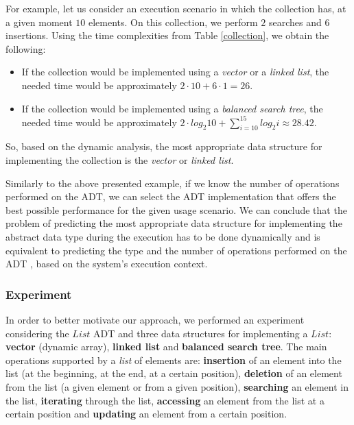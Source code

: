 For example, let us consider an execution scenario in which the collection has, at a given moment $10$ elements. On this collection, we perform $2$ searches and $6$ insertions. Using the time complexities from Table \ref{collection}, we obtain the following:

\begin{itemize}

\item If the collection would be implemented using a \emph{vector} or a \emph{linked list}, the needed time would be approximately $2 \cdot 10 + 6 \cdot 1=26$. 

\item If the collection would be implemented using a \emph{balanced search tree}, the needed time would be approximately $ 2 \cdot log_2{10} + \sum \limits_{i=10}^{15}{log_{2}i} \approx 28.42 $. 

\end{itemize}   
    
So, based on the dynamic analysis, the most appropriate data structure for implementing the collection is the \emph{vector} or \emph{linked list}. 

Similarly to the above presented example, if we know the number of operations performed on the ADT, we can select the ADT implementation that offers the best possible performance for the given usage scenario. We can conclude that the problem of predicting the most appropriate data structure for implementing the abstract data type during the execution has to be done dynamically and is equivalent to predicting the type and the number of operations performed on the ADT , based on the system's execution context.  

\subsubsection{Experiment}\label{exper}

In order to better motivate our approach, we performed an experiment considering the $List$ ADT and three data structures for implementing a $List$: \textbf{vector} (dynamic array), \textbf{linked list} and \textbf{balanced search tree}. The main operations supported by a \emph{list} of elements are: \textbf{insertion} of an element into the list (at the beginning, at the end, at a certain position), \textbf{deletion} of an element from the list (a given element or from a given position), \textbf{searching} an element in the list, \textbf{iterating} through the list, \textbf{accessing} an element from the list at a certain position and \textbf{updating} an element from a certain position.

